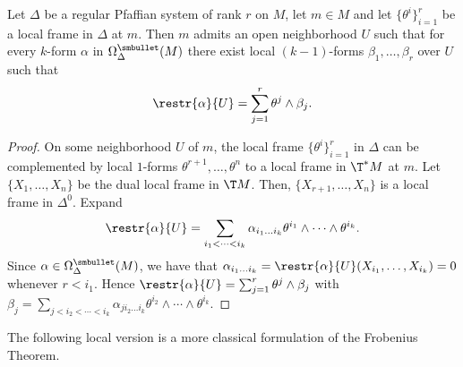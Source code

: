 \begin{lem}[{{\cite[Lem.~4.7.9]{RS1}}}]\label{lem 4.7.9 RS1}
    Let $\Delta$ be a regular Pfaffian system of rank $r$ on $M$, let $m\in M$ and let $\{\theta^i\}_{i=1}^r$ be a local frame in $\Delta$ at $m$. Then $m$ admits an open neighborhood $U$ such that for every $k$-form $\alpha$ in $\Omega^{\smbullet }_\Delta(M)$ there exist local $(k-1)$-forms $\beta_1,\ldots,\beta_r$ over $U$ such that
    \[\restr{\alpha}{U}=\sum_{j=1}^{r}\theta^j\wedge \beta_j.\]
\end{lem}
\begin{proof}
    On some neighborhood $U$ of $m$, the local frame $\{\theta^i\}_{i=1}^r$ in $\Delta$ can be complemented by local $1$-forms $\theta^{r+1}, \ldots,\theta^n$ to a local frame in $\T^\ast M$ at $m$. Let $\{X_1,\ldots,X_n\}$ be the dual local frame in $\T M$. Then, $\{X_{r+1},\ldots,X_n\}$ is a local frame in $\Delta^0$. Expand
    \[\restr{\alpha}{U}=\sum_{i_1<\cdots<i_k} \alpha_{i_1\ldots i_k}\theta^{i_1}\wedge\cdots\wedge \theta^{i_k}.\]
    Since $\alpha\in\Omega^{\smbullet }_\Delta(M)$, we have that $\alpha_{i_1\ldots i_k}=\restr{\alpha}{U}(X_{i_1},\ldots,X_{i_k})=0$ whenever $r<i_1$. Hence $\restr{\alpha}{U}=\sum_{j=1}^r \theta^j\wedge\beta_j$ with $\beta_j=\sum_{j<i_2<\cdots<i_k} \alpha_{ji_2\ldots i_k}\theta^{i_2}\wedge\cdots\wedge \theta^{i_k}$.
\end{proof}

The following local version is a more classical formulation of the Frobenius Theorem.

